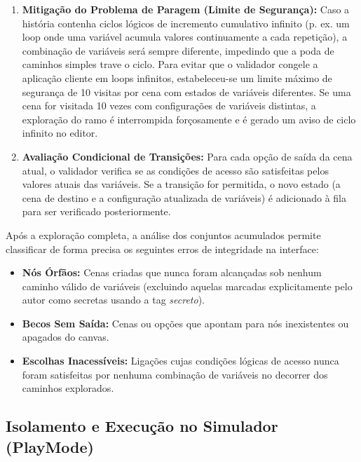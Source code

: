 \begin{enumerate}
    \item \textbf{Mitigação do Problema de Paragem (Limite de Segurança):}
    Caso a história contenha ciclos lógicos de incremento cumulativo infinito (p. ex. um loop onde uma variável acumula valores continuamente a cada repetição), a combinação de variáveis será sempre diferente, impedindo que a poda de caminhos simples trave o ciclo. Para evitar que o validador congele a aplicação cliente em loops infinitos, estabeleceu-se um limite máximo de segurança de 10 visitas por cena com estados de variáveis diferentes. Se uma cena for visitada 10 vezes com configurações de variáveis distintas, a exploração do ramo é interrompida forçosamente e é gerado um aviso de ciclo infinito no editor.

    \item \textbf{Avaliação Condicional de Transições:}
    Para cada opção de saída da cena atual, o validador verifica se as condições de acesso são satisfeitas pelos valores atuais das variáveis. Se a transição for permitida, o novo estado (a cena de destino e a configuração atualizada de variáveis) é adicionado à fila para ser verificado posteriormente.
\end{enumerate}

Após a exploração completa, a análise dos conjuntos acumulados permite classificar de forma precisa os seguintes erros de integridade na interface:
\begin{itemize}
    \item \textbf{Nós Órfãos:} Cenas criadas que nunca foram alcançadas sob nenhum caminho válido de variáveis (excluindo aquelas marcadas explicitamente pelo autor como secretas usando a tag \textit{secreto}).
    \item \textbf{Becos Sem Saída:} Cenas ou opções que apontam para nós inexistentes ou apagados do canvas.
    \item \textbf{Escolhas Inacessíveis:} Ligações cujas condições lógicas de acesso nunca foram satisfeitas por nenhuma combinação de variáveis no decorrer dos caminhos explorados.
\end{itemize}

\subsection{Isolamento e Execução no Simulador (PlayMode)}
\label{subsec:simulador-playmode-walker}

